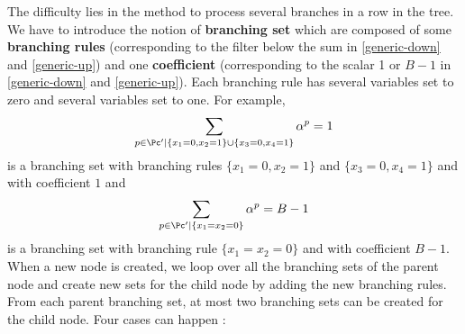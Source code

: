 The difficulty lies in the method to process several branches in a row in the tree. We have to introduce the notion of \textbf{branching set} which are composed of some \textbf{branching rules} (corresponding to the filter below the sum in \eqref{generic-down} and \eqref{generic-up}) and one \textbf{coefficient} (corresponding to the scalar 1 or $B-1$ in \eqref{generic-down} and \eqref{generic-up}). Each branching rule has several variables set to zero and several variables set to one. For example, 
\begin{equation*}
	\sum_{p \in \Pc' | \{x_1 = 0, x_2 = 1\} \cup \{x_3 = 0, x_4 = 1\}} \alpha^p = 1
\end{equation*}
is a branching set with branching rules $\{x_1 = 0, x_2 = 1\}$ and $\{x_3 = 0, x_4 = 1\}$ and with coefficient $1$ and 
\begin{equation*}
	\sum_{p \in \Pc' | \{x_1 = x_2 = 0\}} \alpha^p = B-1
\end{equation*}
is a branching set with branching rule $\{x_1 = x_2 = 0\}$ and with coefficient $B-1$. When a new node is created, we loop over all the branching sets of the parent node and create new sets for the child node by adding the new branching rules. From each parent branching set, at most two branching sets can be created for the child node. Four cases can happen : 

